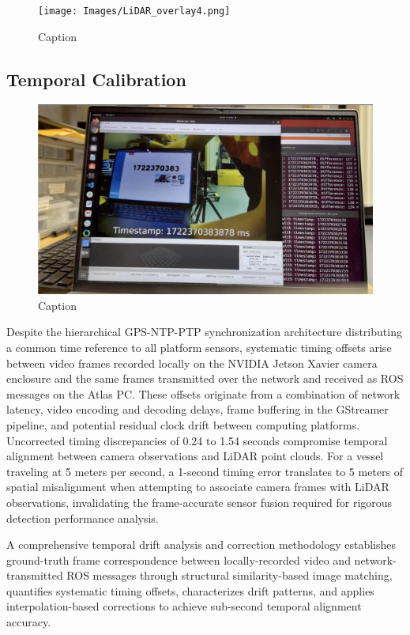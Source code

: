 \documentclass{erauthesis}
\begin{document}
\begin{figure}[htbp]
    \centering
    \texttt{[image: Images/LiDAR\_overlay4.png]}
    \caption{Caption}
    \label{fig:LiDAR_overlay4}
\end{figure}


\subsection{Temporal Calibration}

\begin{figure}[htbp]
    \centering
    \includegraphics[width=0.8\linewidth]{Images/time_sync1.png}
    \caption{Caption}
    \label{fig:time_sync1}
\end{figure}


Despite the hierarchical GPS-NTP-PTP synchronization architecture distributing a common time reference to all platform sensors, systematic timing offsets arise between video frames recorded locally on the NVIDIA Jetson Xavier camera enclosure and the same frames transmitted over the network and received as ROS messages on the Atlas PC.
These offsets originate from a combination of network latency, video encoding and decoding delays, frame buffering in the GStreamer pipeline, and potential residual clock drift between computing platforms.
Uncorrected timing discrepancies of 0.24 to 1.54 seconds compromise temporal alignment between camera observations and LiDAR point clouds.
For a vessel traveling at 5 meters per second, a 1-second timing error translates to 5 meters of spatial misalignment when attempting to associate camera frames with LiDAR observations, invalidating the frame-accurate sensor fusion required for rigorous detection performance analysis.

A comprehensive temporal drift analysis and correction methodology establishes ground-truth frame correspondence between locally-recorded video and network-transmitted ROS messages through structural similarity-based image matching, quantifies systematic timing offsets, characterizes drift patterns, and applies interpolation-based corrections to achieve sub-second temporal alignment accuracy.
\end{document}
